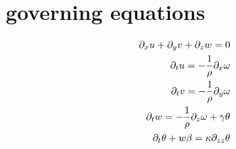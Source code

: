 \documentclass[11pt]{article}
\begin{document}
\newpage
\section{governing equations}
\begin{equation}\begin{aligned}
\partial_x u + \partial_y v + \partial_z w = 0 \\
\partial_t u = -\frac{1}{\rho} \partial_x \omega     \\
\partial_t v = -\frac{1}{\rho} \partial_y \omega     \\
\partial_t w = -\frac{1}{\rho} \partial_z \omega + \gamma \theta \\
\partial_t \theta + w \beta = \kappa \partial_{zz} \theta \\
\end{aligned} \end{equation}
\end{document}
